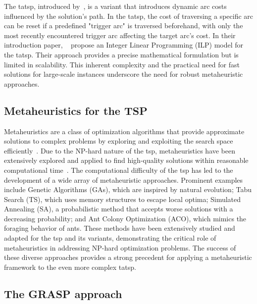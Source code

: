 \documentclass[twocolumn, switch]{article} %
\begin{document}
The \gls{tatsp}, introduced by~\citet{Cerrone}, is a variant that introduces dynamic arc costs influenced by the solution's path. 
In the \gls{tatsp}, the cost of traversing a specific arc can be reset if a predefined "trigger arc" is traversed beforehand, 
with only the most recently encountered trigger arc affecting the target arc's cost. In their introduction paper, ~\citet{Cerrone} 
propose an Integer Linear Programming (ILP) model for the \gls{tatsp}. Their approach provides a precise mathematical formulation 
but is limited in scalability. This inherent complexity and the practical need for fast solutions for large-scale instances underscore
 the need for robust metaheuristic approaches.

\subsection{Metaheuristics for the TSP}
\label{sec:metaheuristics_tsp}

Metaheuristics are a class of optimization algorithms that provide approximate solutions to complex problems by exploring and exploiting the search space efficiently~\cite{Gendreau2010}. Due to the NP-hard nature of the \gls{tsp}, metaheuristics have been extensively explored and applied to find high-quality solutions within reasonable computational time~\cite{toaza2023}. 
The computational difficulty of the \gls{tsp} has led to the development of a wide array of metaheuristic approaches. Prominent examples include Genetic Algorithms (GAs), which are inspired by natural evolution; Tabu Search (TS), which uses memory structures to escape local optima; Simulated Annealing (SA), a probabilistic method that accepts worse solutions with a decreasing probability; and Ant Colony Optimization (ACO), which mimics the foraging behavior of ants. These methods have been extensively studied and adapted for the \gls{tsp} and its variants, demonstrating the critical role of metaheuristics in addressing NP-hard optimization problems. The success of these diverse approaches provides a strong precedent for applying a metaheuristic framework to the even more complex \gls{tatsp}.

\subsection{The GRASP approach}
\end{document}
